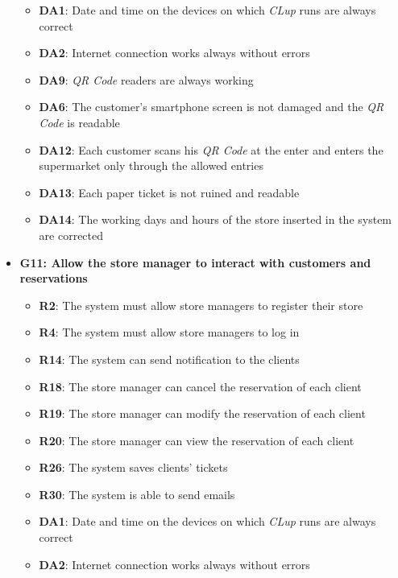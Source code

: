 \documentclass{article}
\begin{document}
\begin{itemize}
\begin{itemize}
						\item {\bfseries DA1}: Date and time on the devices on which \emph{CLup} runs are always correct
						\item {\bfseries DA2}: Internet connection works always without errors
						\item {\bfseries DA9}: \emph{QR Code} readers are always working
						\item{\bfseries DA6}: The customer’s smartphone screen is not damaged and the \emph{QR Code} is readable
						\item {\bfseries DA12}: Each customer scans his \emph{QR Code} at the enter and enters the supermarket only through the allowed entries
						\item {\bfseries DA13}: Each paper ticket is not ruined and readable
						\item {\bfseries DA14}: The working days and hours of the store inserted in the system are corrected
					
					\end{itemize}
				\newpage
				\item {\bfseries G11: Allow the store manager to interact with customers and reservations}	

					\begin{itemize}
						\item {\bfseries R2}: The system must allow store managers to register their store
						\item {\bfseries R4}: The system must allow store managers to log in
						\item {\bfseries R14}: The system can send notification to the clients
						\item {\bfseries R18}: The store manager can cancel the reservation of each client
						\item {\bfseries R19}: The store manager can modify the reservation of each client
						\item {\bfseries R20}: The store manager can view the reservation of each client
						\item {\bfseries R26}: The system saves clients' tickets
						\item{\bfseries R30}: The system is able to send emails \\
		
						\item {\bfseries DA1}: Date and time on the devices on which \emph{CLup} runs are always correct
						\item {\bfseries DA2}: Internet connection works always without errors
						\newpage
		
					\end{itemize}

			\end{itemize}
\end{document}
